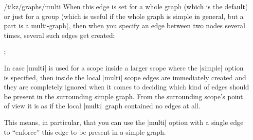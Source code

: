 \begin{key}{/tikz/graphs/multi}
    When this edge is set for a whole graph (which is the default) or just for
    a group (which is useful if the whole graph is simple in general, but a
    part is a multi-graph), then when you specify an edge between two nodes
    several times, several such edges get created:
\begin{codeexample}[preamble={\usetikzlibrary{graphs}}]
\tikz {};
\end{codeexample}
    In case |multi| is used for a scope inside a larger scope where the
    |simple| option is specified, then inside the local |multi| scope edges are
    immediately created and they are completely ignored when it comes to
    deciding which kind of edges should be present in the surrounding simple
    graph. From the surrounding scope's point of view it is as if the local
    |multi| graph contained no edges at all.

    This means, in particular, that you can use the |multi| option with a
    single edge to ``enforce'' this edge to be present in a simple graph.
\end{key}

